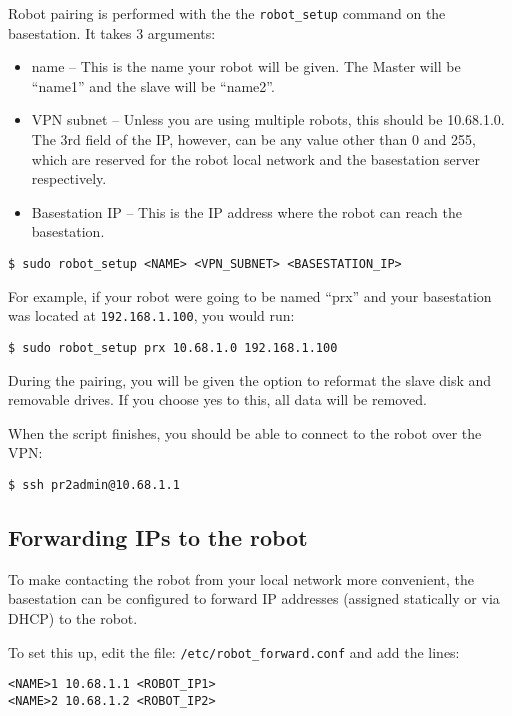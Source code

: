 Robot pairing is performed with the the \texttt{robot\_setup} command
on the basestation.  It takes 3 arguments:

\begin{itemize}
\item name -- This is the name your robot will be given.  The Master will be ``name1'' and the slave will be ``name2''.
\item VPN subnet -- Unless you are using multiple robots, this should be 10.68.1.0.  The 3rd field of the IP, however, can be any value other than 0 and 255, which are reserved for the robot local network and the basestation server respectively.
\item Basestation IP -- This is the IP address where the robot can reach the basestation.
\end{itemize}


\begin{verbatim}
$ sudo robot_setup <NAME> <VPN_SUBNET> <BASESTATION_IP>
\end{verbatim}

For example, if your robot were going to be named ``prx'' and your basestation was located at \texttt{192.168.1.100}, you would run:

\begin{verbatim}
$ sudo robot_setup prx 10.68.1.0 192.168.1.100
\end{verbatim}

During the pairing, you will be given the option to reformat the slave
disk and removable drives.  If you choose yes to this, all data will
be removed.

When the script finishes, you should be able to connect to the robot over the VPN:

\begin{verbatim}
$ ssh pr2admin@10.68.1.1
\end{verbatim}

\subsection{Forwarding IPs to the robot}

To make contacting the robot from your local network more convenient,
the basestation can be configured to forward IP addresses (assigned
statically or via DHCP) to the robot.

To set this up, edit the file: \texttt{/etc/robot\_forward.conf} and add the lines:

\begin{verbatim}
<NAME>1 10.68.1.1 <ROBOT_IP1>
<NAME>2 10.68.1.2 <ROBOT_IP2>
\end{verbatim}

